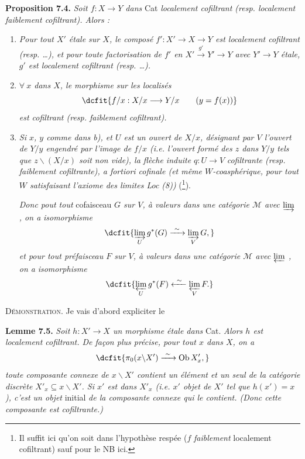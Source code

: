 \documentclass[11pt]{article}
\newcommand{\printedpage}[1]{\marginpar{\footnotesize p.~#1}}
\def\dcprintedpending{}
\newcommand{\msp}[1]{\marginpar{\footnotesize\raggedright
  \ifx\dcprintedpending\empty\else p.~\dcprintedpending\par\fi
  [#1]}\gdef\dcprintedpending{}}
\begin{document}
\textbf{Proposition 7.4.} \textit{Soit $f : X \longrightarrow Y$ dans} Cat \textit{localement cofiltrant (resp. localement faiblement cofiltrant). Alors :}
\begin{enumerate}
\item[\textit{a)}] \textit{Pour tout $X'$ étale sur $X$, le composé $f' : X' \longrightarrow X \longrightarrow Y$ est localement cofiltrant (resp. \dots), et pour toute factorisation de $f'$ en $X' \xrightarrow{g'} Y' \longrightarrow Y$ avec $Y' \longrightarrow Y$ étale, $g'$ est localement cofiltrant (resp. \dots).}
\item[\textit{b)}] \textit{$\forall\ x$ dans $X$, le morphisme sur les localisés}
\[
\dcfit{f/x : X/x \longrightarrow Y/x \qquad (y = f(x)) %
}
\]
\textit{est cofiltrant (resp. faiblement cofiltrant).}
\item[\textit{c)}] \textit{Si $x$, $y$ comme dans b), et $U$ est un ouvert de $X/x$, désignant par $V$ l'ouvert de $Y/y$ engendré par l'image de $f/x$ (i.e. l'ouvert formé des $z$ dans $Y/y$ tels que $z\backslash(X/x)$ soit non vide), la flèche induite $q : U \longrightarrow V$} \textit{cofiltrante (resp. faiblement cofiltrante), a fortiori cofinale (et même $W$-coasphérique, pour tout $W$ satisfaisant l'axiome des limites Loc (8))} (\footnote[65]{Il suffit ici qu'on soit dans l'hypothèse respée ($f$ \textit{faiblement} localement cofiltrant) sauf pour le NB ici. %
}). %

\msp{page 93}
\textit{Donc pout tout} cofaisceau \textit{$G$ sur $V$, à valeurs dans une catégorie $\mathcal{M}$ avec $\varinjlim$ , on a} \textit{isomorphisme} %
\[
\dcfit{\varinjlim_U g^*(G) \xrightarrow{\ \sim\ } \varinjlim_V G,
}
\]
\printedpage{58}
\textit{et pour tout préfaisceau $F$ sur $V$, à valeurs dans une catégorie $\mathcal{M}$ avec $\varprojlim$ , on a} \textit{isomorphisme}
\[
\dcfit{\varprojlim_U g^*(F) \xleftarrow{\ \sim\ } \varprojlim_V F.
}
\]
\end{enumerate}

\textsc{Démonstration}. Je vais d'abord expliciter le

\textbf{Lemme 7.5.} \textit{Soit $h : X' \longrightarrow X$ un morphisme étale dans} Cat. \textit{Alors $h$ est localement cofiltrant. De façon plus précise, pour tout $x$ dans $X$, on a}
\[
\dcfit{\pi_0(x\backslash X') \xrightarrow{\ \sim\ } \mathrm{Ob}\,X'_x,
}
\]
\textit{toute composante connexe de $x\backslash X'$ contient un élément et un seul de la catégorie discrète $X'_x \subseteq x\backslash X'$. Si $x'$ est dans $X'_x$ (i.e. $x'$ objet de $X'$ tel que $h(x') = x$), c'est un objet} initial \textit{de la composante connexe qui le contient. (Donc cette composante est cofiltrante.)}
\end{document}
